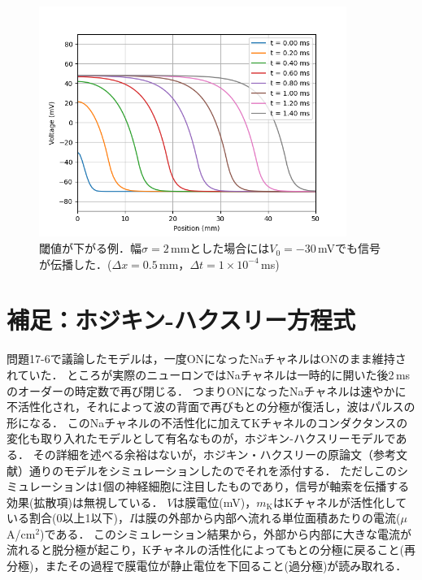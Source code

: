 \documentclass[a4paper,11pt]{jsarticle}
\begin{document}
\begin{figure}[htbp]
  \centering
  \includegraphics[width=10cm]{wave_s=2.png}
  \caption{閾値が下がる例．幅$\sigma=2$\,mmとした場合には$V_0=-30$\,mVでも信号が伝播した．($\Delta x=0.5$\,mm，$\Delta t = 1\times 10^{-4}$\,ms)}
  \label{fig:s_2}
\end{figure}

\section{補足：ホジキン-ハクスリー方程式}
問題17-6で議論したモデルは，一度ONになったNaチャネルはONのまま維持されていた．
ところが実際のニューロンではNaチャネルは一時的に開いた後2\,msのオーダーの時定数で再び閉じる．
つまりONになったNaチャネルは速やかに不活性化され，それによって波の背面で再びもとの分極が復活し，波はパルスの形になる．
このNaチャネルの不活性化に加えてKチャネルのコンダクタンスの変化も取り入れたモデルとして有名なものが，ホジキン-ハクスリーモデルである．
その詳細を述べる余裕はないが，ホジキン・ハクスリーの原論文（参考文献\cite{hh}）通りのモデルをシミュレーションしたのでそれを添付する．
ただしこのシミュレーションは1個の神経細胞に注目したものであり，信号が軸索を伝播する効果(拡散項)は無視している．
$V$は膜電位(mV)，$m_{\mathrm{K}}$はKチャネルが活性化している割合(0以上1以下)，$I$は膜の外部から内部へ流れる単位面積あたりの電流($\mu$A/cm$^{2}$)である．
このシミュレーション結果から，外部から内部に大きな電流が流れると脱分極が起こり，Kチャネルの活性化によってもとの分極に戻ること(再分極)，またその過程で膜電位が静止電位を下回ること(過分極)が読み取れる．
\end{document}
